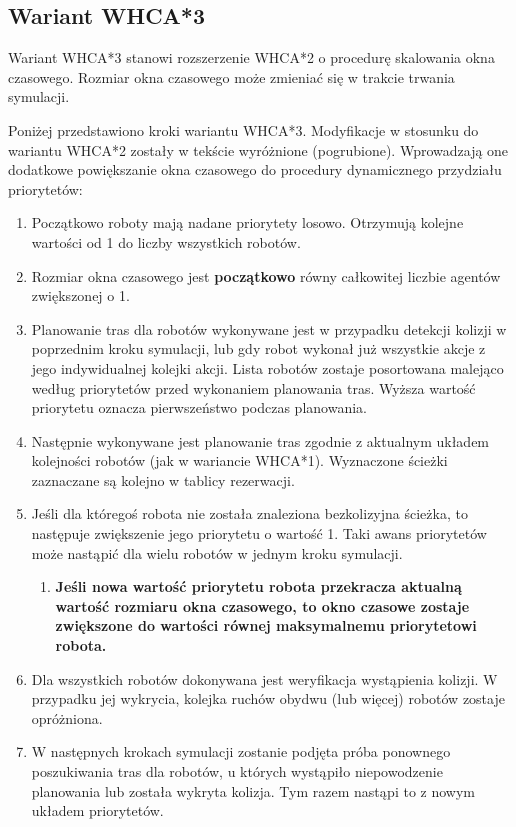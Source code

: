 \subsection{Wariant WHCA*3}
Wariant WHCA*3 stanowi rozszerzenie WHCA*2 o procedurę skalowania okna czasowego.
Rozmiar okna czasowego może zmieniać się w trakcie trwania symulacji.

Poniżej przedstawiono kroki wariantu WHCA*3. Modyfikacje w stosunku do wariantu WHCA*2 zostały w tekście wyróżnione (pogrubione). Wprowadzają one dodatkowe powiększanie okna czasowego do procedury dynamicznego przydziału priorytetów:
\begin{enumerate}
	\item Początkowo roboty mają nadane priorytety losowo. Otrzymują kolejne wartości od 1 do liczby wszystkich robotów.
	\item Rozmiar okna czasowego jest {\bf początkowo} równy całkowitej liczbie agentów zwiększonej o 1.
	\item Planowanie tras dla robotów wykonywane jest w przypadku detekcji kolizji w poprzednim kroku symulacji, lub gdy robot wykonał już wszystkie akcje z jego indywidualnej kolejki akcji.
	Lista robotów zostaje posortowana malejąco według priorytetów przed wykonaniem planowania tras. Wyższa wartość priorytetu oznacza pierwszeństwo podczas planowania.
	\item Następnie wykonywane jest planowanie tras zgodnie z aktualnym układem kolejności robotów (jak w wariancie WHCA*1). Wyznaczone ścieżki zaznaczane są kolejno w tablicy rezerwacji.
	\item Jeśli dla któregoś robota nie została znaleziona bezkolizyjna ścieżka, to następuje zwiększenie jego priorytetu o wartość 1. Taki awans priorytetów może nastąpić dla wielu robotów w jednym kroku symulacji.
	\begin{enumerate}
		\item {\bf Jeśli nowa wartość priorytetu robota przekracza aktualną wartość rozmiaru okna czasowego, to okno czasowe zostaje zwiększone do wartości równej maksymalnemu priorytetowi robota.}
	\end{enumerate}
	\item Dla wszystkich robotów dokonywana jest weryfikacja wystąpienia kolizji. W przypadku jej wykrycia, kolejka ruchów obydwu (lub więcej) robotów zostaje opróżniona.
	\item W następnych krokach symulacji zostanie podjęta próba ponownego poszukiwania tras dla robotów, u których wystąpiło niepowodzenie planowania lub została wykryta kolizja. Tym razem nastąpi to z nowym układem priorytetów.
\end{enumerate}

